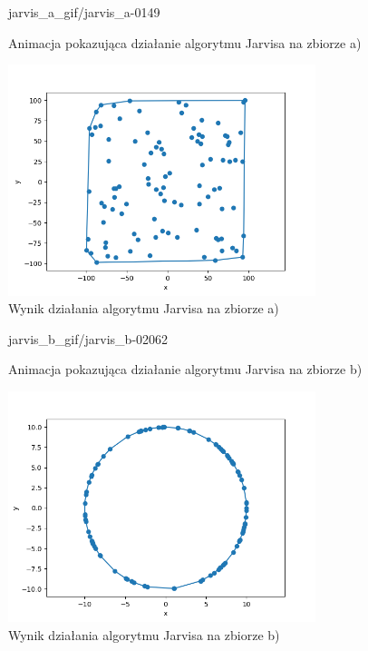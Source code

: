 \documentclass[a4paper]{article}
\begin{document}
\pagebreak
\begin{figure}[H]
    {jarvis_a_gif/jarvis_a-}{0}{149}
    \centering
    \caption{Animacja pokazująca działanie algorytmu Jarvisa na zbiorze a)}
    \label{fig:anim_jarvis_a}
\end{figure}

\begin{figure}[H]
    \centering
    \includegraphics[width=0.8\textwidth]{jarvis/jarvis_a_png.png}
    \caption{Wynik działania algorytmu Jarvisa na zbiorze a)}
    \label{fig:jarvis_a}
\end{figure}

\begin{figure}[H]
    {jarvis_b_gif/jarvis_b-}{0}{2062}
    \centering
    \caption{Animacja pokazująca działanie algorytmu Jarvisa na zbiorze b)}
    \label{fig:anim_jarvis_b}
\end{figure}

\begin{figure}[H]
    \centering
    \includegraphics[width=0.8\textwidth]{jarvis/jarvis_b_png.png}
    \caption{Wynik działania algorytmu Jarvisa na zbiorze b)}
    \label{fig:jarvis_b}
\end{figure}
\end{document}
